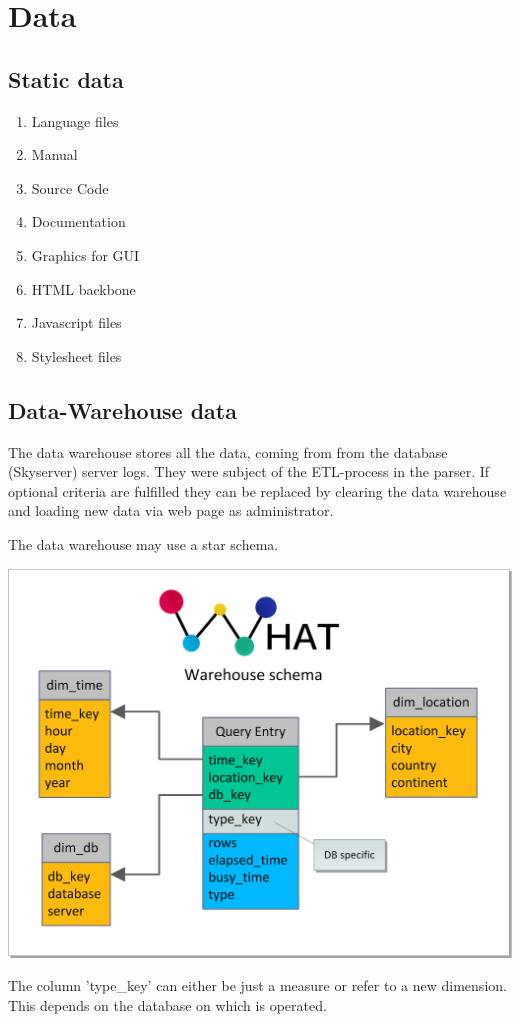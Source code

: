 \section{Data}
\renewcommand{\theenumi}{/D\arabic{enumi}0/}
\renewcommand{\labelenumi}{\theenumi}

\subsection{Static data}

\begin{enumerate}
  \item Language files
  \item Manual
  \item Source Code
  \item Documentation
  \item Graphics for GUI
  \item HTML backbone
  \item Javascript files
  \item Stylesheet files
\end{enumerate}



\newpage
\subsection{Data-Warehouse data} \label{WHschema}


The data warehouse stores all the data, coming from from the database (Skyserver) server logs.
They were subject of the ETL-process in the parser. If optional criteria are fulfilled
 they can be replaced by clearing the data warehouse 
 and loading new data via web page as administrator.

The data warehouse may use a star schema.
\begin{center}
\includegraphics[width=1\linewidth]{Pictures/WareHouseSchema.png} 
\end{center}   
The column 'type\_key' can either be just a measure or refer to a new dimension. This depends on the database
on which is operated.  

